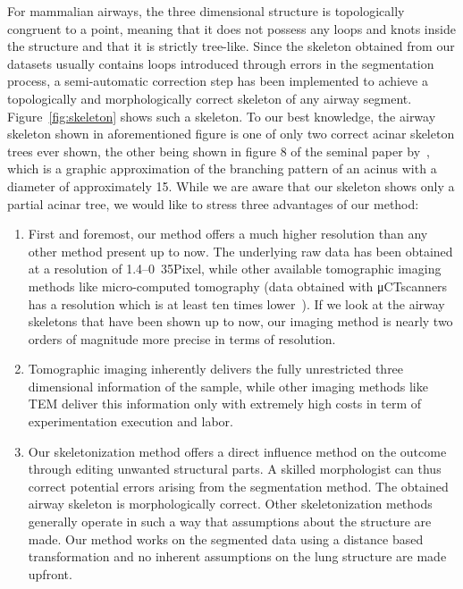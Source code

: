 \documentclass[]{scrartcl}
\begin{document}
For mammalian airways, the three dimensional structure is topologically congruent to a point, meaning that it does not possess any loops and knots inside the structure and that it is strictly tree-like. Since the skeleton obtained from our datasets usually contains loops introduced through errors in the segmentation process, a semi-automatic correction step has been implemented to achieve a topologically and morphologically correct skeleton of any airway segment. Figure~\ref{fig:skeleton} shows such a skeleton. To our best knowledge, the airway skeleton shown in aforementioned figure is one of only two correct acinar skeleton trees ever shown, the other being shown in figure 8 of the seminal paper by~\citet{Haefeli-Bleuer1988}, which is a graphic approximation of the branching pattern of an acinus with a diameter of approximately \unit{15}{\milli\meter}. While we are aware that our skeleton shows only a partial acinar tree, we would like to stress three advantages of our method: 
\begin{enumerate}
	\item First and foremost, our method offers a much higher resolution than any other method present up to now. The underlying raw data has been obtained at a resolution of 1.4--\unit{0.35}{\micro\meter\per Pixel}, while other available tomographic imaging methods like micro-computed tomography (data obtained with \unit{\micro CT}{scanners} has a resolution which is at least ten times lower~\cite{Watz2005}). If we look at the airway skeletons that have been shown up to now, our imaging method is nearly two orders of magnitude more precise in terms of resolution.
	\item Tomographic imaging inherently delivers the fully unrestricted three dimensional information of the sample, while other imaging methods like TEM deliver this information only with extremely high costs in term of experimentation execution and labor.
	\item Our skeletonization method offers a direct influence method on the outcome through editing unwanted structural parts. A skilled morphologist can thus correct potential errors arising from the segmentation method. The obtained airway skeleton is morphologically correct. Other skeletonization methods generally operate in such a way that assumptions about the structure are made. Our method works on the segmented data using a distance based transformation and no inherent assumptions on the lung structure are made upfront.
\end{enumerate}
\end{document}
